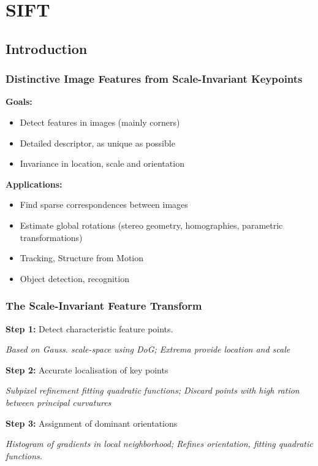 \chapter{SIFT}

\section{Introduction}

\subsection{Distinctive Image Features from Scale-Invariant Keypoints}

\textbf{Goals:} \begin{itemize}
    \item Detect features in images (mainly corners)
    \item Detailed descriptor, as unique as possible
    \item Invariance in location, scale and orientation
\end{itemize}

\textbf{Applications:} \begin{itemize}
    \item Find sparse correspondences between images
    \item Estimate global rotations (stereo geometry, homographies, parametric transformations)
    \item Tracking, Structure from Motion
    \item Object detection, recognition
\end{itemize}

\subsection{The Scale-Invariant Feature Transform}

\textbf{Step 1:} Detect characteristic feature points.

\textit{Based on Gauss. scale-space using DoG; Extrema provide location and scale}

\textbf{Step 2:} Accurate localisation of key points

\textit{Subpixel refinement fitting quadratic functions; Discard points with high ration between principal curvatures}

\textbf{Step 3:} Assignment of dominant orientations

\textit{Histogram of gradients in local neighborhood; Refines orientation, fitting quadratic functions.}

